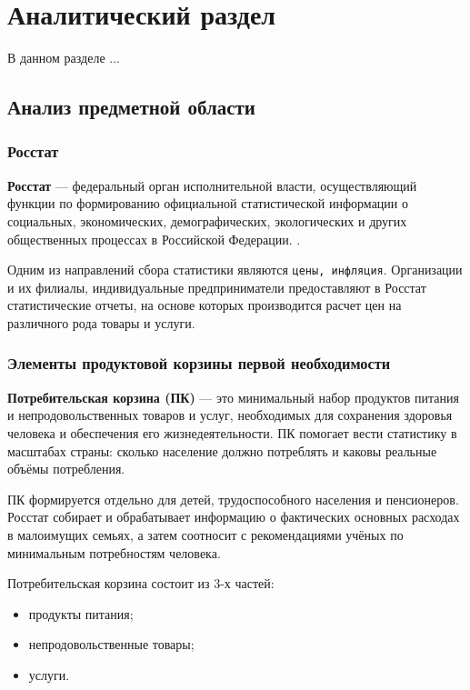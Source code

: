 \chapter{Аналитический раздел}

В данном разделе ... %

\section{Анализ предметной области}

\subsection{Росстат}

\textbf{Росстат} ---  федеральный орган исполнительной власти, осуществляющий функции по формированию официальной статистической информации о социальных, экономических, демографических, экологических и других общественных процессах в Российской Федерации. \cite{info_rosstat}.

Одним из направлений сбора статистики являются \texttt{цены, инфляция}. Организации и их филиалы, индивидуальные предприниматели предоставляют в Росстат статистические отчеты, на основе которых производится расчет цен на различного рода товары и услуги.

\subsection{Элементы продуктовой корзины первой необходимости}

\textbf{Потребительская корзина (ПК)} --- это минимальный набор продуктов питания и непродовольственных товаров и услуг, необходимых для сохранения здоровья человека и обеспечения его жизнедеятельности\cite{info_consumer_basket2}. ПК помогает вести статистику в масштабах страны: сколько население должно потреблять и каковы реальные объёмы потребления.

ПК формируется отдельно для детей, трудоспособного населения и пенсионеров. Росстат собирает и обрабатывает информацию о фактических основных расходах в малоимущих семьях, а затем соотносит с рекомендациями учёных по минимальным потребностям человека.

Потребительская корзина состоит из 3-х частей:

\begin{itemize}[label=--]
	\item продукты питания;
	\item непродовольственные товары;
	\item услуги.
\end{itemize}

